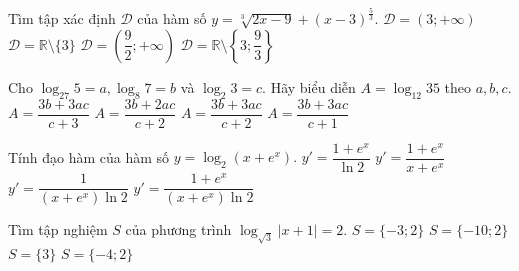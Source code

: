 \begin{ex}%
Tìm tập xác định $\mathscr{D}$ của hàm số $y=\sqrt[3]{2x-9}+(x-3)^{\frac{5}{3}}$.
\choice
{\True $\mathscr{D} = (3;+\infty)$}
{$\mathscr{D} = \mathbb{R}\setminus \{3\}$}
{$\mathscr{D} = \left(\dfrac{9}{2};+\infty\right)$}
{$\mathscr{D} = \mathbb{R}\setminus \left\{3;\dfrac{9}{3}\right\}$}
\end{ex}

\begin{ex}%
Cho $\log_{27}5=a, \log_{8}7=b$ và $ \log_{2}3=c$. Hãy biểu diễn $A=\log_{12}35$ theo  $a,b,c$.
\choice
{$A=\dfrac{3b+3ac}{c+3}$}
{$A=\dfrac{3b+2ac}{c+2}$}
{\True $A=\dfrac{3b+3ac}{c+2}$}
{$A=\dfrac{3b+3ac}{c+1}$}
\end{ex}

\begin{ex}%
Tính đạo hàm của hàm số $y=\log_2\left(x+e^x\right).$
\choice
{$y' = \dfrac{1+e^x}{\ln 2}$}
{$y' = \dfrac{1+e^x}{x+e^x}$}
{$y' = \dfrac{1}{(x+e^x)\ln 2}$}
{\True $y' = \dfrac{1+e^x}{(x+e^x)\ln 2}$}
\end{ex}

\begin{ex}%
Tìm tập nghiệm $S$ của phương trình $\log_{\sqrt{3}}|x+1| = 2$.
\choice
{$S=\{-3;2\}$}
{$S=\{-10;2\}$}
{$S=\{3\}$}
{\True $S=\{-4;2\}$}
\end{ex}


